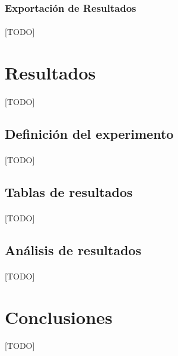 \documentclass{subfiles}
\begin{document}
        \subsubsection{Exportación de Resultados}
        \label{sec:implementation_components_exportation}

          \paragraph{}
          [TODO]

    \section{Resultados}
    \label{sec:results}

      \paragraph{}
      [TODO]

      \subsection{Definición del experimento}
      \label{sec:results_definition}

        \paragraph{}
        [TODO]

      \subsection{Tablas de resultados}
      \label{sec:results_tables}

        \paragraph{}
        [TODO]

      \subsection{Análisis de resultados}
      \label{sec:results_analysis}

        \paragraph{}
        [TODO]

    \section{Conclusiones}
    \label{sec:implementation_results_conclusions}

      \paragraph{}
      [TODO]
\end{document}
